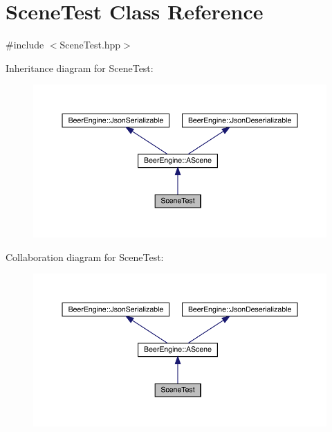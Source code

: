 \hypertarget{class_scene_test}{}\section{Scene\+Test Class Reference}
\label{class_scene_test}


{\ttfamily \#include $<$Scene\+Test.\+hpp$>$}



Inheritance diagram for Scene\+Test\+:
\nopagebreak
\begin{figure}[H]
\begin{center}
\leavevmode
\includegraphics[width=350pt]{class_scene_test__inherit__graph}
\end{center}
\end{figure}


Collaboration diagram for Scene\+Test\+:
\nopagebreak
\begin{figure}[H]
\begin{center}
\leavevmode
\includegraphics[width=350pt]{class_scene_test__coll__graph}
\end{center}
\end{figure}
